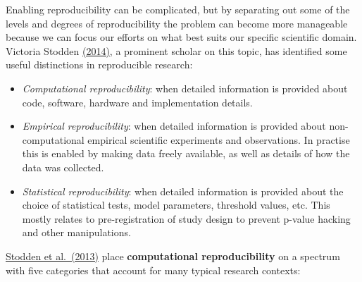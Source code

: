 \documentclass[
]{book}
\begin{document}
Enabling reproducibility can be complicated, but by separating out some of the levels and degrees of reproducibility the problem can become more manageable because we can focus our efforts on what best suits our specific scientific domain. Victoria Stodden \href{http://edge.org/response-detail/25340}{(2014)}, a prominent scholar on this topic, has identified some useful distinctions in reproducible research:

\begin{itemize}
\item
  \emph{Computational reproducibility}: when detailed information is provided about code, software, hardware and implementation details.
\item
  \emph{Empirical reproducibility}: when detailed information is provided about non-computational empirical scientific experiments and observations. In practise this is enabled by making data freely available, as well as details of how the data was collected.
\item
  \emph{Statistical reproducibility}: when detailed information is provided about the choice of statistical tests, model parameters, threshold values, etc. This mostly relates to pre-registration of study design to prevent p-value hacking and other manipulations.
\end{itemize}

\href{http://stodden.net/icerm_report.pdf}{Stodden et al.~(2013)} place \textbf{computational reproducibility} on a spectrum with five categories that account for many typical research contexts:
\end{document}
